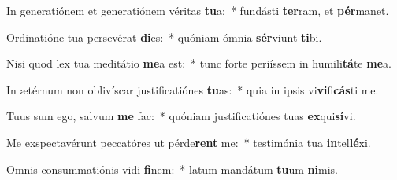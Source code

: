 \item In generatiónem et generatiónem véritas \textbf{tu}a:~* fundásti \textbf{ter}ram, et \textbf{pér}manet.
\item Ordinatióne tua persevérat \textbf{di}es:~* quóniam ómnia \textbf{sér}viunt \textbf{ti}bi.
\item Nisi quod lex tua meditátio \textbf{me}a est:~* tunc forte periíssem in humili\textbf{tá}te \textbf{me}a.
\item In ætérnum non oblivíscar justificatiónes \textbf{tu}as:~* quia in ipsis vi\textbf{vi}fi\textbf{cás}ti me.
\item Tuus sum ego, salvum \textbf{me} fac:~* quóniam justificatiónes tuas \textbf{ex}qui\textbf{sí}vi.
\item Me exspectavérunt peccatóres ut pérde\textbf{rent} me:~* testimónia tua \textbf{in}tel\textbf{lé}xi.
\item Omnis consummatiónis vidi \textbf{fi}nem:~* latum mandátum \textbf{tu}um \textbf{ni}mis.
